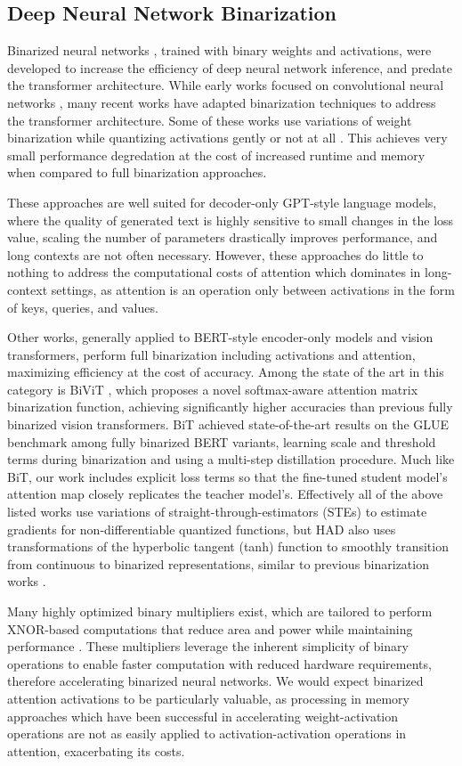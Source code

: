 \subsection{Deep Neural Network Binarization}
Binarized neural networks \cite{bnn}, trained with binary weights and activations, were developed to increase the efficiency of deep neural network inference, and predate the transformer architecture.  While early works focused on convolutional neural networks \cite{bin_cnn}, many recent works have adapted binarization techniques to address the transformer architecture.  Some of these works use variations of weight binarization while quantizing activations gently or not at all \cite{pbllm,onebit}.  This achieves very small performance degredation at the cost of increased runtime and memory when compared to full binarization approaches. 
\par These approaches are well suited for decoder-only GPT-style language models, where the quality of generated text is highly sensitive to small changes in the loss value, scaling the number of parameters drastically improves performance, and long contexts are not often necessary.  However, these approaches do little to nothing to address the computational costs of attention which dominates in long-context settings, as attention is an operation only between activations in the form of keys, queries, and values.  
\par Other works, generally applied to BERT-style encoder-only models and vision transformers, perform full binarization including activations and attention, maximizing efficiency at the cost of accuracy.  Among the state of the art in this category is BiViT \cite{bivit}, which proposes a novel softmax-aware attention matrix binarization function, achieving significantly higher accuracies than previous fully binarized vision transformers.  BiT \cite{bit} achieved state-of-the-art results on the GLUE benchmark among fully binarized BERT variants, learning scale and threshold terms during binarization and using a multi-step distillation procedure.  Much like BiT, our work includes explicit loss terms so that the fine-tuned student model's attention map closely replicates the teacher model's.  Effectively all of the above listed works use variations of straight-through-estimators (STEs) to estimate gradients for non-differentiable quantized functions, but HAD also uses transformations of the hyperbolic tangent (tanh) function to smoothly transition from continuous to binarized representations, similar to previous binarization works \cite{tanh_bin}. 
\par Many highly optimized binary multipliers exist, which are tailored to perform XNOR-based computations that reduce area and power while maintaining performance \cite{rastegari2016xnor,lee2022power,garg2013array}. These multipliers leverage the inherent simplicity of binary operations to enable faster computation with reduced hardware requirements, therefore accelerating binarized neural networks. We would expect binarized attention activations to be particularly valuable, as processing in memory approaches which have been successful in accelerating weight-activation operations \cite{pim} are not as easily applied to activation-activation operations in attention, exacerbating its costs.

